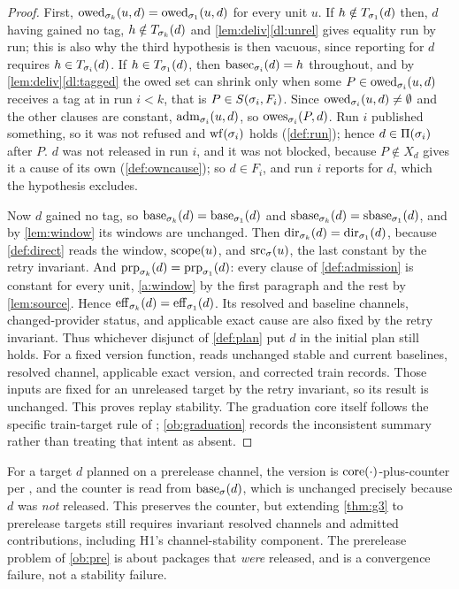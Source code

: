 \begin{proof}
First, $\mathrm{owed}_{\sigma_k}(u,d) = \mathrm{owed}_{\sigma_1}(u,d)$ for every unit $u$. If
$h \notin T_{\sigma_1}(d)$ then, $d$ having gained no tag, $h \notin
T_{\sigma_k}(d)$ and \cref{lem:deliv}\ref{dl:unrel} gives equality run by
run; this is also why the third hypothesis is then vacuous, since reporting
 for $d$ requires $h \in T_{\sigma_i}(d)$. If $h \in
T_{\sigma_1}(d)$, then $\mathrm{basec}_{\sigma_i}(d) = h$ throughout, and by
\cref{lem:deliv}\ref{dl:tagged} the owed set can shrink only when some $P \in
\mathrm{owed}_{\sigma_i}(u,d)$ receives a tag at \Head{} in run $i < k$, that is $P \in
S(\sigma_i,F_i)$. Since $\mathrm{owed}_{\sigma_i}(u,d) \neq \emptyset$ and the other
clauses are constant, $\mathrm{adm}_{\sigma_i}(u,d)$, so $\mathrm{owes}_{\sigma_i}(P,d)$. Run $i$
published something, so it was not refused and $\mathrm{wf}(\sigma_i)$ holds
(\cref{def:run}); hence $d \in \Pi(\sigma_i)$ after $P$. $d$ was
not released in run $i$, and it was not blocked, because $P \notin X_d$ gives
it a cause of its own (\cref{def:owncause}); so $d \in F_i$, and run $i$
reports  for $d$, which the hypothesis excludes.

Now $d$ gained no tag, so $\mathrm{base}_{\sigma_k}(d) = \mathrm{base}_{\sigma_1}(d)$ and
$\mathrm{sbase}_{\sigma_k}(d) = \mathrm{sbase}_{\sigma_1}(d)$, and by \cref{lem:window} its windows
are unchanged. Then $\mathrm{dir}_{\sigma_k}(d) = \mathrm{dir}_{\sigma_1}(d)$, because
\cref{def:direct} reads the window, $\mathrm{scope}(u)$, and $\mathrm{src}_{\sigma}(u)$, the last
constant by the retry invariant. And $\mathrm{prp}_{\sigma_k}(d) = \mathrm{prp}_{\sigma_1}(d)$:
every clause of \cref{def:admission} is constant for every unit, \cref{a:window}
by the first paragraph and the rest by \cref{lem:source}. Hence $\mathrm{eff}_{\sigma_k}(d) = \mathrm{eff}_{\sigma_1}(d)$. Its resolved and baseline channels, changed-provider status, and applicable exact  cause are also fixed by the retry invariant. Thus whichever disjunct of \cref{def:plan} put $d$ in the initial plan still holds. For a fixed version function,  reads unchanged stable and current baselines, resolved channel, applicable exact version, and corrected train records. Those inputs are fixed for an unreleased target by the retry invariant, so its result is unchanged. This proves replay stability. The graduation core itself follows the specific train-target rule of ; \cref{ob:graduation} records the inconsistent  summary rather than treating that intent as absent.
\end{proof}

\begin{remark}
\label{rem:g3-pre}
For a target $d$ planned on a prerelease channel, the version is
$\mathrm{core}(\cdot)$-plus-counter per , and the counter is read from
$\mathrm{base}_{\sigma}(d)$, which is unchanged precisely because $d$ was \emph{not}
released. This preserves the counter, but extending \cref{thm:g3} to
prerelease targets still requires invariant resolved channels and admitted
contributions, including H1's channel-stability component. The
prerelease problem of \cref{ob:pre} is about packages that \emph{were}
released, and is a convergence failure, not a stability failure.
\end{remark}

